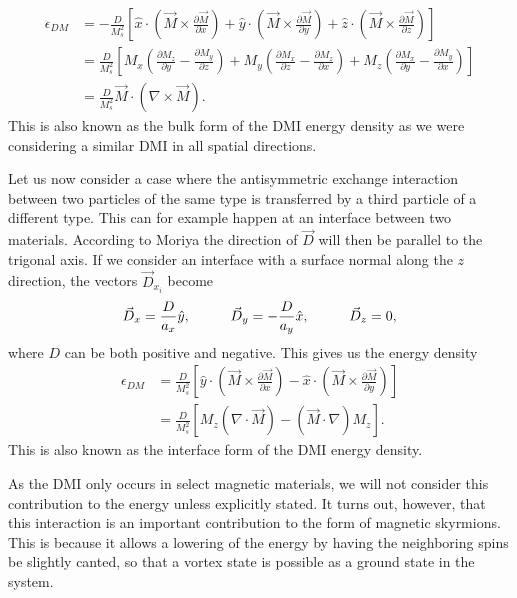 \documentclass[12pt, a4paper, twoside, openright]{article}		%
\numberwithin{equation}{section}
\begin{document}
\begin{align}
\nonumber \epsilon_{DM} &= -\frac{D}{M_s^2} \left[ \hat{x}\cdot(\vec{M}\times\frac{\partial\vec{M}}{\partial x}) + \hat{y}\cdot(\vec{M}\times\frac{\partial\vec{M}}{\partial y}) + \hat{z}\cdot (\vec{M}\times\frac{\partial\vec{M}}{\partial z})\right] \\
\nonumber &= \frac{D}{M_s^2}\left[M_x(\frac{\partial M_z}{\partial y} - \frac{\partial M_y}{\partial z}) + M_y(\frac{\partial M_x}{\partial z} - \frac{\partial M_z}{\partial x}) + M_z(\frac{\partial M_x}{\partial y} - \frac{\partial M_y}{\partial x})\right] \\
&= \frac{D}{M_s^2} \vec{M}\cdot(\nabla\times\vec{M}). \label{eq:BulkDMI}
\end{align}
This is also known as the bulk form of the DMI energy density as we were considering a similar DMI in all spatial directions.

Let us now consider a case where the antisymmetric exchange interaction between two particles of the same type is transferred by a third particle of a different type. This can for example happen at an interface between two materials. According to Moriya the direction of $\vec{D}$ will then be parallel to the trigonal axis. If we consider an interface with a surface normal along the $z$ direction, the vectors $\vec{D}_{x_i}$ become
\begin{align}
\vec{D}_x = \frac{D}{a_x} \hat{y}, \hspace{10mm}
\vec{D}_y = - \frac{D}{a_y} \hat{x}, \hspace{10mm}
\vec{D}_z = 0,
\end{align}
where $D$ can be both positive and negative. This gives us the energy density
\begin{align}
\label{eq:InterfaceDMIe}
\epsilon_{DM} &= \frac{D}{M_s^2}\left[ \hat{y} \cdot(\vec{M}\times\frac{\partial\vec{M}}{\partial x}) - \hat{x} \cdot(\vec{M}\times\frac{\partial\vec{M}}{\partial y})\right] \\
&= \frac{D}{M_s^2}\left[ M_z (\nabla\cdot\vec{M}) - (\vec{M}\cdot\nabla)M_z\right]. \label{eq:IntDMI}
\end{align}
This is also known as the interface form of the DMI energy density.

As the DMI only occurs in select magnetic materials, we will not consider this contribution to the energy unless explicitly stated. It turns out, however, that this interaction is an important contribution to the form of magnetic skyrmions. This is because it allows a lowering of the energy by having the neighboring spins be slightly canted, so that a vortex state is possible as a ground state in the system.
\end{document}
